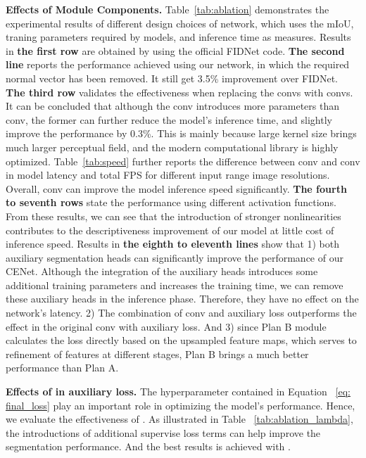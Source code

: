 \documentclass{article}
\begin{document}
\noindent\textbf{Effects  of Module Components.} 
Table~\ref{tab:ablation} demonstrates the experimental results of different design choices of network, which uses the mIoU, traning parameters required by models, and inference time as measures. Results in \textbf{the first row} are obtained by using the official FIDNet code. \textbf{The second line} reports the performance achieved using our network, in which the required normal vector has been removed. It still get  3.5\% improvement over FIDNet. \textbf{The third row} validates the effectiveness when replacing the  convs with  convs. It can be concluded that although the  conv introduces more parameters than  conv, the former can further reduce the model's inference time, and slightly improve the performance by 0.3\%. This is mainly because large kernel size brings much larger perceptual field, and the modern computational library is highly optimized. Table~\ref{tab:speed} further reports the difference between  conv and  conv in model latency and total FPS for different input range image resolutions. Overall,  conv can improve the model inference speed significantly. \textbf{The fourth to seventh rows} state the performance using different activation functions. From these results, we can see that the introduction of stronger nonlinearities contributes to the descriptiveness improvement of our model at little cost of inference speed. Results in \textbf{the eighth to eleventh lines} show that 1) both auxiliary segmentation heads can significantly improve the performance of our CENet. Although the integration of the auxiliary heads introduces some additional training parameters and increases the training time, we can remove these auxiliary heads in the inference phase. Therefore, they have no effect on the network's latency. 2) The combination of  conv and auxiliary loss outperforms the effect in the original  conv with auxiliary loss. And 3) since Plan B module calculates the loss directly based on the upsampled feature maps, which serves to refinement of features at different stages, Plan B brings a much better performance than Plan A. 

\noindent\textbf{Effects  of  in auxiliary loss.} The hyperparameter  contained in Equation ~\ref{eq: final_loss} play an important role in optimizing the model's performance. Hence, we evaluate the effectiveness of . As illustrated in Table ~\ref{tab:ablation_lambda}, the introductions of additional supervise loss terms can help improve the segmentation performance. And the best results is achieved with .   
\end{document}
